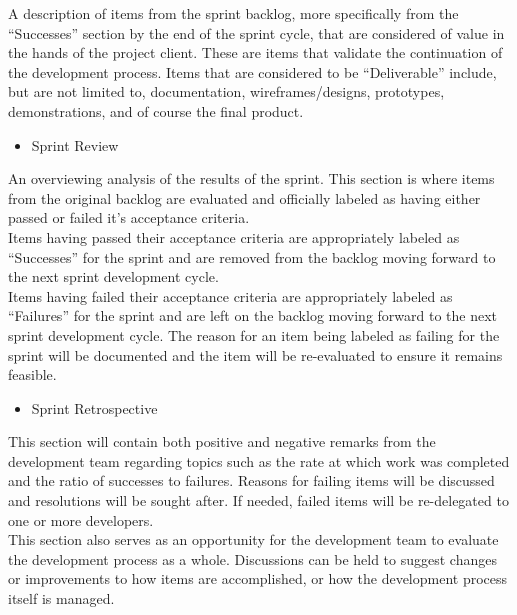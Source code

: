         A description of items from the sprint backlog, more specifically from the ``Successes'' section by the end of the
        sprint cycle, that are considered of value in the hands of the project client.  These are items that validate the 
        continuation of the development process.  Items that are considered to be ``Deliverable'' include, but are not 
        limited to, documentation, wireframes/designs, prototypes, demonstrations, and of course the final product.\\

    \begin{itemize} \item Sprint Review \end{itemize}
       
        An overviewing analysis of the results of the sprint.  This section is where items from the original backlog
        are evaluated and officially labeled as having either passed or failed it's acceptance criteria.\\

        Items having passed their acceptance criteria are appropriately labeled as ``Successes'' for the sprint and are 
        removed from the backlog moving forward to the next sprint development cycle.\\

        Items having failed their acceptance criteria are appropriately labeled as ``Failures'' for the sprint and are
        left on the backlog moving forward to the next sprint development cycle.  The reason for an item being labeled
        as failing for the sprint will be documented and  the item will be re-evaluated to ensure it remains feasible.\\  

    \begin{itemize} \item Sprint Retrospective \end{itemize}
        
        This section will contain both positive and negative remarks from the development team regarding topics such as 
        the rate at which work was completed and the ratio of successes to failures.  Reasons for failing items will be
        discussed and resolutions will be sought after.  If needed, failed items will be re-delegated to one or more 
        developers.\\

        This section also serves as an opportunity for the development team to evaluate the development process as a whole.
        Discussions can be held to suggest changes or improvements to how items are accomplished, or how the development
        process itself is managed.


